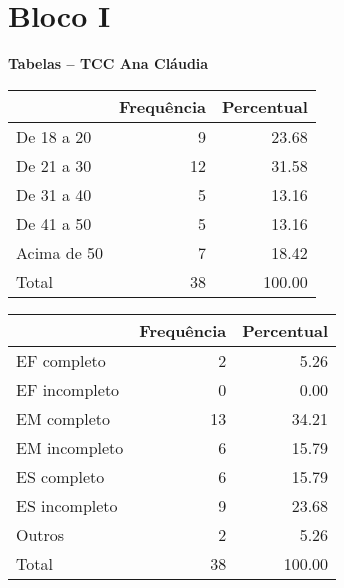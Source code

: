 \documentclass[a4paper, 12pt, openright, oneside, german, french, english, brazil, article]{abntex2}
\begin{document}
	
	\section{Bloco I}
	\begin{center}
			\textbf{Tabelas -- TCC Ana Cláudia}
	\end{center}
	
	\begin{table}[ht]
		\ibgetab{
		\centering
	}
		{\begin{tabular}{lrr}
			\hline
			& Frequência & Percentual \\ 
			\hline
			De 18 a 20 &   9 & 23.68 \\ 
			De 21 a 30 &  12 & 31.58 \\ 
			De 31 a 40 &   5 & 13.16 \\ 
			De 41 a 50 &   5 & 13.16 \\ 
			Acima de 50 &   7 & 18.42 \\ 
			Total &  38 & 100.00 \\ 
			\hline
		\end{tabular}
	}
	{}
	\end{table}
	
	\begin{table}[ht]
		\ibgetab{
		\centering
	}
		{\begin{tabular}{lrr}
			\hline
			& Frequência & Percentual \\ 
			\hline
			EF completo &   2 & 5.26 \\ 
			EF incompleto &   0 & 0.00 \\ 
			EM completo &  13 & 34.21 \\ 
			EM incompleto &   6 & 15.79 \\ 
			ES completo &   6 & 15.79 \\ 
			ES incompleto &   9 & 23.68 \\ 
			Outros &   2 & 5.26 \\ 
			Total &  38 & 100.00 \\ 
			\hline
		\end{tabular}
	}
	{}
	\end{table}
	
\end{document}
